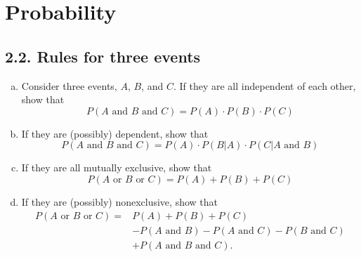\chapter{Probability}

\section*{2.2. Rules for three events}
\begin{enumerate}[(a)]
    \item Consider three events, $A$, $B$, and $C$. 
        If they are all independent of each other,
        show that
        \begin{equation*}\tag{2.76}
            P(A \text{ and } B \text{ and } C) = P(A) \cdot P(B) \cdot P(C) 
        \end{equation*}

    \item If they are (possibly) dependent, show that 
        \begin{equation*}\tag{2.77}
            P(A \text{ and } B \text{ and } C) = P(A) \cdot P(B | A) \cdot P(C | A \text{ and } B) 
        \end{equation*}

    \item If they are all mutually exclusive, show that
        \begin{equation*}\tag{2.78}
            P(A \text{ or } B \text{ or } C) = P(A) + P(B) + P(C)
        \end{equation*}

    \item If they are (possibly) nonexclusive, show that
        \begin{align*}\tag{2.79}
            P(A \text{ or } B \text{ or } C) =& P(A) + P(B) + P(C) \\
                                          &- P(A \text{ and } B) - P(A \text{ and } C) - P(B \text{ and } C) \\
                                          &+ P(A \text{ and } B \text{ and } C)
        .\end{align*}
\end{enumerate}

